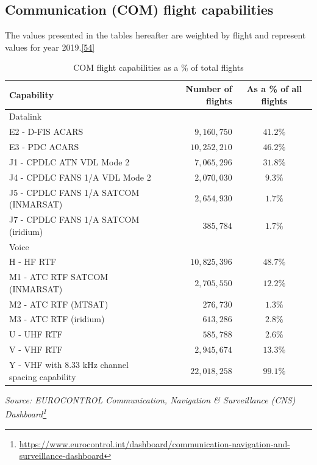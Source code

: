 \documentclass[
  11pt,
  a4paper,
]{book}
\DeclareRobustCommand{\href}[2]{#2\footnote{\url{#1}}}
\begin{document}
\hypertarget{communication-com-flight-capabilities}{%
\subsection{Communication (COM) flight
capabilities}\label{communication-com-flight-capabilities}}

The values presented in the tables hereafter are weighted by flight and
represent values for year
2019.\protect\hyperlink{ref-cns:dashboard}{{[}54{]}}

\hypertarget{tbl-com-flight}{}
\setlength{\LTpost}{0mm}
\begin{longtable}{lrc}
\caption{\label{tbl-com-flight}COM flight capabilities as a \% of total flights }\tabularnewline

\toprule
Capability & Number of flights & As a \% of all flights \\ 
\midrule
\multicolumn{3}{l}{Datalink} \\ 
\midrule
E2 - D-FIS ACARS & $9,160,750$ & $41.2\%$ \\ 
E3 - PDC ACARS & $10,252,210$ & $46.2\%$ \\ 
J1 - CPDLC ATN VDL Mode 2 & $7,065,296$ & $31.8\%$ \\ 
J4 - CPDLC FANS 1/A VDL Mode 2 & $2,070,030$ & $9.3\%$ \\ 
J5 - CPDLC FANS 1/A SATCOM (INMARSAT) & $2,654,930$ & $1.7\%$ \\ 
J7 - CPDLC FANS 1/A SATCOM (iridium) & $385,784$ & $1.7\%$ \\ 
\midrule
\multicolumn{3}{l}{Voice} \\ 
\midrule
H - HF RTF & $10,825,396$ & $48.7\%$ \\ 
M1 - ATC RTF SATCOM (INMARSAT) & $2,705,550$ & $12.2\%$ \\ 
M2 - ATC RTF (MTSAT) & $276,730$ & $1.3\%$ \\ 
M3 - ATC RTF (iridium) & $613,286$ & $2.8\%$ \\ 
U - UHF RTF & $585,788$ & $2.6\%$ \\ 
V - VHF RTF & $2,945,674$ & $13.3\%$ \\ 
Y - VHF with 8.33 kHz channel spacing capability & $22,018,258$ & $99.1\%$ \\ 
\bottomrule
\end{longtable}
\begin{minipage}{\linewidth}
\emph{Source: \href{https://www.eurocontrol.int/dashboard/communication-navigation-and-surveillance-dashboard}{EUROCONTROL Communication, Navigation \& Surveillance (CNS) Dashboard}}\\
\end{minipage}
\end{document}

